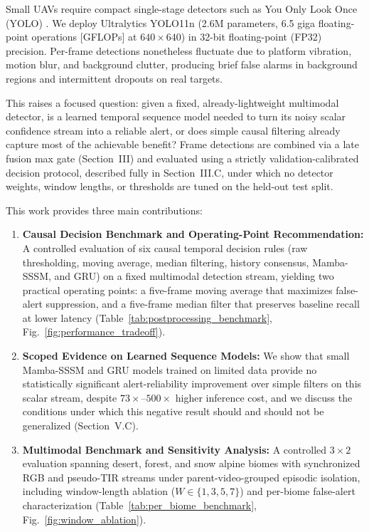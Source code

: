 \documentclass[conference]{IEEEtran}
\begin{document}
Small UAVs require compact single-stage detectors such as You Only Look Once (YOLO) \cite{redmon2016you}. We deploy Ultralytics YOLO11n \cite{jocher2024yolo11} (2.6M parameters, 6.5 giga floating-point operations [GFLOPs] at $640 \times 640$) in 32-bit floating-point (FP32) precision. Per-frame detections nonetheless fluctuate due to platform vibration, motion blur, and background clutter, producing brief false alarms in background regions and intermittent dropouts on real targets.

This raises a focused question: given a fixed, already-lightweight multimodal detector, is a learned temporal sequence model needed to turn its noisy scalar confidence stream into a reliable alert, or does simple causal filtering already capture most of the achievable benefit? Frame detections are combined via a late fusion max gate (Section~III) and evaluated using a strictly validation-calibrated decision protocol, described fully in Section~III.C, under which no detector weights, window lengths, or thresholds are tuned on the held-out test split.

This work provides three main contributions:
\begin{enumerate}
\item \textbf{Causal Decision Benchmark and Operating-Point Recommendation:} A controlled evaluation of six causal temporal decision rules (raw thresholding, moving average, median filtering, history consensus, Mamba-SSSM, and GRU) on a fixed multimodal detection stream, yielding two practical operating points: a five-frame moving average that maximizes false-alert suppression, and a five-frame median filter that preserves baseline recall at lower latency (Table~\ref{tab:postprocessing_benchmark}, Fig.~\ref{fig:performance_tradeoff}).
\item \textbf{Scoped Evidence on Learned Sequence Models:} We show that small Mamba-SSSM and GRU models trained on limited data provide no statistically significant alert-reliability improvement over simple filters on this scalar stream, despite $73\times$--$500\times$ higher inference cost, and we discuss the conditions under which this negative result should and should not be generalized (Section~V.C).
\item \textbf{Multimodal Benchmark and Sensitivity Analysis:} A controlled $3\times 2$ evaluation spanning desert, forest, and snow alpine biomes with synchronized RGB and pseudo-TIR streams under parent-video-grouped episodic isolation, including window-length ablation ($W \in \{1,3,5,7\}$) and per-biome false-alert characterization (Table~\ref{tab:per_biome_benchmark}, Fig.~\ref{fig:window_ablation}).
\end{enumerate}
\end{document}
